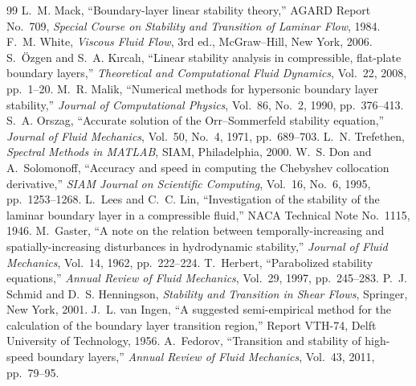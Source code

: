\documentclass[11pt]{article}
\begin{document}
\begin{thebibliography}{99}
 L.~M. Mack, ``Boundary-layer linear stability theory,'' AGARD Report No.~709,
  \emph{Special Course on Stability and Transition of Laminar Flow}, 1984.
 F.~M. White, \emph{Viscous Fluid Flow}, 3rd ed., McGraw--Hill, New York, 2006.
 S.~\"Ozgen and S.~A. K{\i}rcal{\i}, ``Linear stability analysis in compressible,
  flat-plate boundary layers,'' \emph{Theoretical and Computational Fluid Dynamics}, Vol.~22, 2008,
  pp.~1--20.
 M.~R. Malik, ``Numerical methods for hypersonic boundary layer stability,''
  \emph{Journal of Computational Physics}, Vol.~86, No.~2, 1990, pp.~376--413.
 S.~A. Orszag, ``Accurate solution of the Orr--Sommerfeld stability equation,''
  \emph{Journal of Fluid Mechanics}, Vol.~50, No.~4, 1971, pp.~689--703.
 L.~N. Trefethen, \emph{Spectral Methods in MATLAB}, SIAM, Philadelphia,
  2000.
 W.~S. Don and A.~Solomonoff, ``Accuracy and speed in computing the Chebyshev
  collocation derivative,'' \emph{SIAM Journal on Scientific Computing}, Vol.~16, No.~6, 1995,
  pp.~1253--1268.
 L.~Lees and C.~C. Lin, ``Investigation of the stability of the laminar boundary
  layer in a compressible fluid,'' NACA Technical Note No.~1115, 1946.
 M.~Gaster, ``A note on the relation between temporally-increasing and
  spatially-increasing disturbances in hydrodynamic stability,'' \emph{Journal of Fluid Mechanics},
  Vol.~14, 1962, pp.~222--224.
 T.~Herbert, ``Parabolized stability equations,'' \emph{Annual Review of Fluid
  Mechanics}, Vol.~29, 1997, pp.~245--283.
 P.~J. Schmid and D.~S. Henningson, \emph{Stability and Transition in Shear
  Flows}, Springer, New York, 2001.
 J.~L. van Ingen, ``A suggested semi-empirical method for the calculation of the
  boundary layer transition region,'' Report VTH-74, Delft University of Technology, 1956.
 A.~Fedorov, ``Transition and stability of high-speed boundary layers,''
  \emph{Annual Review of Fluid Mechanics}, Vol.~43, 2011, pp.~79--95.
\end{thebibliography}
\end{document}
